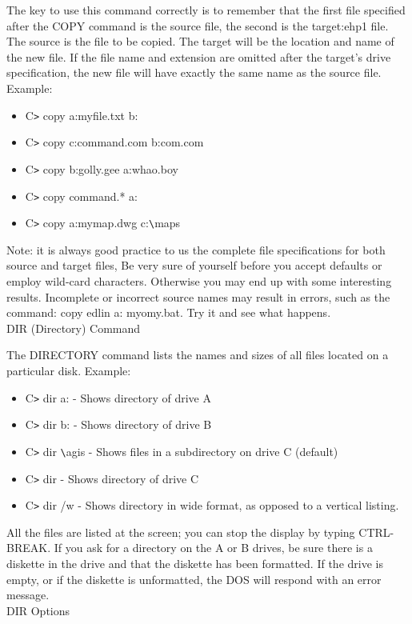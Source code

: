 \documentclass[11pt,a4paper,twoside]{article}
\begin{document}
The key to use this command correctly is to remember that the first file specified after the COPY command is the source file, the second is the target:ehp1 file. The source is the file to be copied. The target will be the location and name of the new file. If the file name and extension are omitted after the target's drive specification, the new file will have exactly the same name as the source file.\\
Example:
\begin{itemize}
    \item C\verb=>= copy a:myfile.txt b:
\item C\verb=>= copy c:command.com b:com.com
\item C\verb=>= copy b:golly.gee a:whao.boy
\item C\verb=>= copy command.* a:
\item C\verb=>= copy a:mymap.dwg c:\verb=\=maps
\end{itemize}
Note: it is always good practice to us the complete file specifications for both source and target files, Be very sure of yourself before you accept defaults or employ wild-card characters. Otherwise you may end up with some interesting results. Incomplete or incorrect source names may result in errors, such as the command: copy edlin a: myomy.bat. Try it and see what happens.\\
DIR (Directory) Command\par
The DIRECTORY command lists the names and sizes of all files located on a particular disk.
Example:
\begin{itemize}
    \item C\verb=>= dir a: - Shows directory of drive A
\item C\verb=>= dir b: - Shows directory of drive B
\item C\verb=>= dir \verb=\=agis - Shows files in a subdirectory on drive C (default)
\item C\verb=>= dir - Shows directory of drive C
\item C\verb=>= dir /w - Shows directory in wide format, as opposed to a vertical listing.
\end{itemize}
All the files are listed at the screen; you can stop the display by typing CTRL-BREAK. If you ask for a directory on the A or B drives, be sure there is a diskette in the drive and that the diskette has been formatted. If the drive is empty, or if the diskette is unformatted, the DOS will respond with an error message.\\
DIR Options\par
\end{document}
